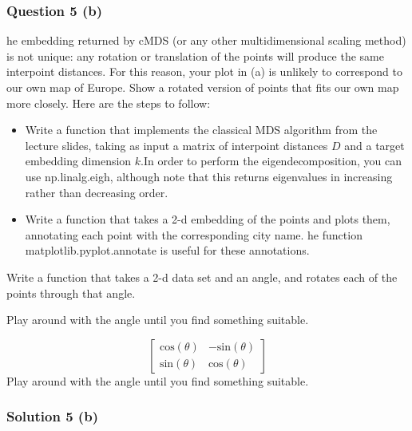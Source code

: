 \documentclass{article}
\begin{document}
\subsubsection*{Question 5 (b)}
\begin{flushleft}
he embedding returned by cMDS (or any other multidimensional scaling method) is not unique:
any rotation or translation of the points will produce the same interpoint distances. For this
reason, your plot in (a) is unlikely to correspond to our own map of Europe. Show a rotated
version of points that ﬁts our own map more closely. Here are the steps to follow:
\begin{itemize}
\item Write a function that implements the classical MDS algorithm from the lecture slides, taking as input a matrix of interpoint distances $D$ and a target embedding dimension $k$.In order
to perform the eigendecomposition, you can use np.linalg.eigh, although note that this
returns eigenvalues in increasing rather than decreasing order.
\item Write a function that takes a 2-d embedding of the points and plots them, annotating each point with the corresponding city name. he function matplotlib.pyplot.annotate is
useful for these annotations.
\end{itemize}
\end{flushleft}
\begin{flushleft}
    \item Write a function that takes a 2-d data set and an angle, and rotates each of the points through that angle.
\item Play around with the angle until you find something suitable.
\end{flushleft}
$$
\begin{bmatrix}
    \text{cos}(\theta) & -\text{sin}(\theta) \\
    \text{sin}(\theta) & \text{cos}(\theta) 
\end{bmatrix}
$$
Play around with the angle until you ﬁnd something suitable.

\subsubsection*{Solution 5 (b)}
\end{document}
